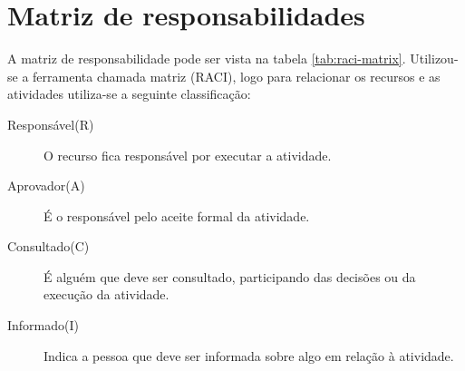 \chapter{Matriz de responsabilidades}
\label{ch:raci-matrix}

A matriz de responsabilidade pode ser vista na tabela \ref{tab:raci-matrix}. Utilizou-se a ferramenta chamada matriz  (RACI), logo para relacionar os recursos e as atividades utiliza-se a seguinte classificação:

\begin{description}
	\item[Responsável(R)] O recurso fica responsável por executar a atividade.
	\item[Aprovador(A)] É o responsável pelo aceite formal da atividade.
	\item[Consultado(C)] É alguém que deve ser consultado, participando das decisões ou da execução da atividade.
	\item[Informado(I)] Indica a pessoa que deve ser informada sobre algo em relação à atividade.
\end{description}

